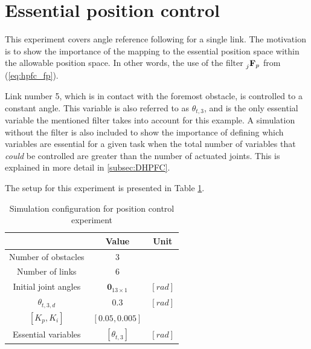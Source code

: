 \section{Essential position control}

This experiment covers angle reference following for a single link. The motivation is to show the importance of the mapping to the essential position space within the allowable position space. In other words, the use of the filter $\prescript{}{j}{\mathbf{F}}_{p}$ from (\ref{eq:hpfc_fp}).

Link number 5, which is in contact with the foremost obstacle, is controlled to a constant angle. This variable is also referred to as $\theta_{t,3}$, and is the only essential variable the mentioned filter takes into account for this example. A simulation without the filter is also included to show the importance of defining which variables are essential for a given task when the total number of variables that \textit{could} be controlled are greater than the number of actuated joints. This is explained in more detail in \ref{subsec:DHPFC}.

The setup for this experiment is presented in Table \ref{tab:exp_single_pos}.

\begin{table}[]
    \centering
    \begin{tabular}{|c|c|c|}
        \hline
        & Value & Unit\\
        \hline
        Number of obstacles & $3$ & \\
        Number of links & $6$ & \\
        Initial joint angles & $\mathbf{0}_{13 \times 1}$ & $[rad]$ \\
        $\theta_{t,3,d}$ & $0.3$ & $[rad]$ \\
        $[K_p, K_i]$ & $[0.05, 0.005]$ &\\
        Essential variables & $[\theta_{t,3}]$ & $[rad]$ \\
        \hline
    \end{tabular}
    \caption{Simulation configuration for position control experiment}
    \label{tab:exp_single_pos}
\end{table}

